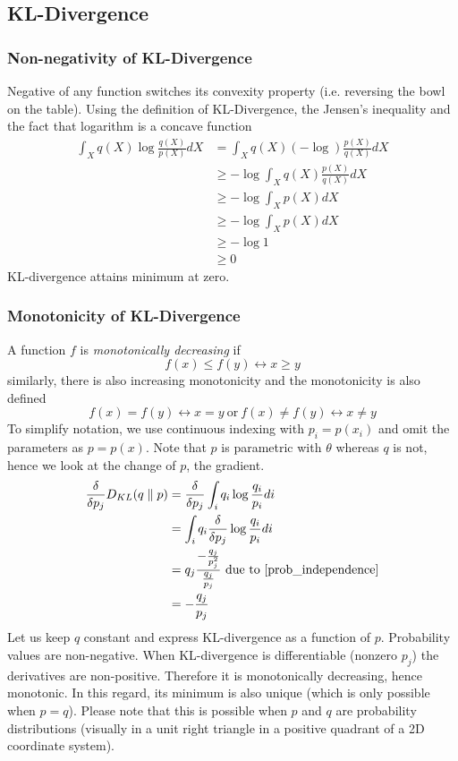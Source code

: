 \documentclass{book}
\numberwithin{equation}{subsection}
\begin{document}
\subsection{KL-Divergence}
\subsubsection{Non-negativity of KL-Divergence}
\label{kl_nonneg}
Negative of any function switches its convexity property (i.e. reversing the bowl on the table). Using the definition of KL-Divergence, the Jensen's inequality and the fact that logarithm is a concave function
\begin{align}
     \int_X q(X)\log\frac{q(X)}{p(X)} dX &= \int_X q(X)(-\log)\frac{p(X)}{q(X)} dX\\
     &\geq -\log \int_X q(X)\frac{p(X)}{q(X)} dX\\
     &\geq -\log \int_X p(X) dX\\
     &\geq -\log \int_X p(X) dX \label{p_sum_1}\\
     &\geq -\log 1 \\
     &\geq 0
\end{align}
KL-divergence attains minimum at zero.
\subsubsection{Monotonicity of KL-Divergence}
A function $f$ is \textit{monotonically decreasing} if
\begin{equation}
    f(x) \leq f(y) \longleftrightarrow x \geq y
\end{equation}
similarly, there is also increasing monotonicity and the monotonicity is also defined
\begin{equation}
    f(x) = f(y) \longleftrightarrow x = y\ \text{or}\ f(x) \neq f(y) \longleftrightarrow x \neq y
\end{equation}
To simplify notation, we use continuous indexing with $p_i=p(x_i)$ and omit the parameters as $p=p(x)$. Note that $p$ is parametric with $\theta$ whereas $q$ is not, hence we look at the change of $p$, the gradient.
\begin{align}
    \frac{\delta}{\delta p_j}D_{KL}(q \parallel p) &= \frac{\delta}{\delta p_j}\int_i q_i\log\frac{q_i}{p_i} di\\
    &= \int_i q_i\frac{\delta}{\delta p_j}\log\frac{q_i}{p_i} di\\
    &= q_j\frac{-\frac{q_j}{p_j^2}}{\frac{q_j}{p_j}}\ \text{due to~\ref{prob_independence}}\\
    &= -\frac{q_j}{p_j} \label{klmonotonicity}
\end{align}
Let us keep $q$ constant and express KL-divergence as a function of $p$. Probability values are non-negative. When KL-divergence is differentiable (nonzero $p_j$) the derivatives are non-positive. Therefore it is monotonically decreasing, hence monotonic. In this regard, its minimum is also unique (which is only possible when $p=q$). Please note that this is possible when $p$ and $q$ are probability distributions (visually in a unit right triangle in a positive quadrant of a 2D coordinate system).
\end{document}
